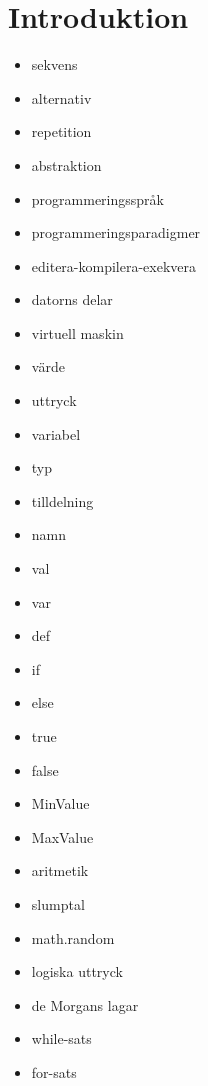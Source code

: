 \chapter{Introduktion}\label{chapter:W01}
\begin{itemize}[nosep]
\item sekvens
\item alternativ
\item repetition
\item abstraktion
\item programmeringsspråk
\item programmeringsparadigmer
\item editera-kompilera-exekvera
\item datorns delar
\item virtuell maskin
\item värde
\item uttryck
\item variabel
\item typ
\item tilldelning
\item namn
\item val
\item var
\item def
\item if
\item else
\item true
\item false
\item MinValue
\item MaxValue
\item aritmetik
\item slumptal
\item math.random
\item logiska uttryck
\item de Morgans lagar
\item while-sats
\item for-sats
\end{itemize}